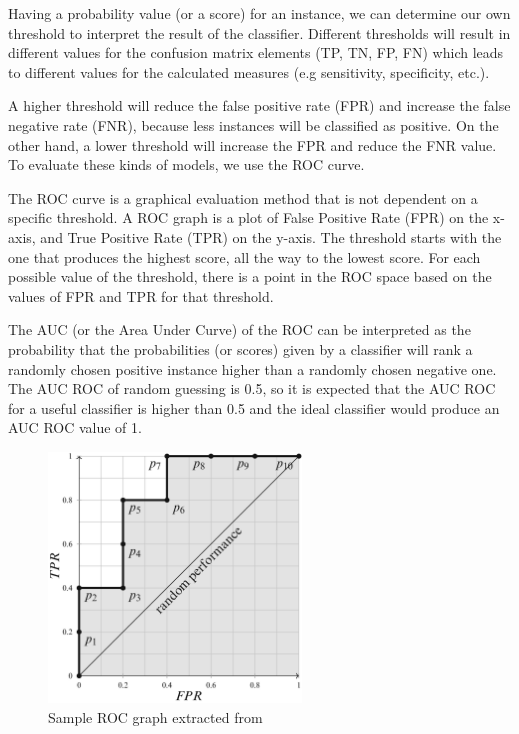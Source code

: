 Having a probability value (or a score) for an instance, we can determine our own threshold to 
interpret the result of the classifier. Different thresholds 
will result in different values for the confusion matrix elements (TP, TN, FP, FN) which leads to 
different values for the calculated measures (e.g sensitivity, specificity, etc.).

A higher threshold will reduce the false positive rate (FPR) and increase the false negative rate 
(FNR), because less instances will be classified as positive. On the other hand, a lower threshold 
will increase the FPR and reduce the FNR value. To evaluate these kinds of models, we use the ROC curve.

The ROC curve \cite{fawcett2006introduction} is a graphical evaluation method that is not dependent 
on a specific threshold. A ROC graph is a plot of False Positive Rate (FPR) on the x-axis, and 
True Positive Rate (TPR) on the y-axis. The threshold starts with the one that produces the highest 
score, all the way to the lowest score. For each possible value of the threshold, there is a point 
in the ROC space based on the values of FPR and TPR for that threshold.

The AUC (or the Area Under Curve) of the ROC can be interpreted as the probability that the 
probabilities (or scores) given by a classifier will rank a randomly chosen positive instance 
higher than a randomly chosen negative one. The AUC ROC of random guessing is 0.5, so it is 
expected that the AUC ROC for a useful classifier is higher than 0.5 and the ideal classifier 
would produce an AUC ROC value of 1.

\begin{figure}[ht]
    \centering
    \includegraphics[width=0.60\textwidth]{figures/12RocExample.png}
    \caption{Sample ROC graph extracted from~\cite{fernandez_learning_2018}}
    \label{fig:roc}
\end{figure}


